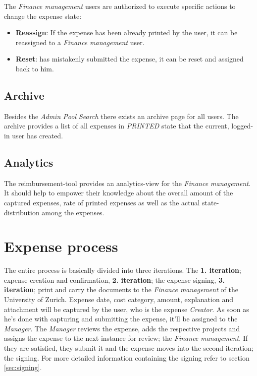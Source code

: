 The \textit{Finance management} users are authorized to execute specific actions to change the expense state:
\begin{itemize}
\item \textbf{Reassign}: If the expense has been already printed by the user, it can be reassigned to a \textit{Finance management} user.
\item \textbf{Reset}: has mistakenly submitted the expense, it can be reset and assigned back to him.
\end{itemize}

\subsection{Archive}
Besides the \textit{Admin Pool Search} there exists an archive page for all users. The archive provides a list of all expenses in \textit{PRINTED} state that the current, logged-in user has created.

\subsection{Analytics}
The reimbursement-tool provides an analytics-view for the \textit{Finance management}. It should help to empower their knowledge about the overall amount of the captured expenses, rate of printed expenses as well as the actual state-distribution among the expenses.


\section{Expense process}
\label{sec:process}

The entire process is basically divided into three iterations. The \textbf{1. iteration}; expense creation and confirmation, \textbf{2. iteration}; the expense signing, \textbf{3. iteration}; print and carry the documents to the \textit{Finance management} of the University of Zurich.\newline
Expense date, cost category, amount, explanation and attachment will be captured by the user, who is the expense \textit{Creator}. As soon as he's done with capturing and submitting the expense, it'll be assigned to the \textit{Manager}. The \textit{Manager} reviews the expense, adds the respective projects and assigns the expense to the next instance for review; the \textit{Finance management}. If they are satisfied, they submit it and the expense moves into the second iteration; the signing. For more detailed information containing the signing refer to section \ref{sec:signing}.\newline

